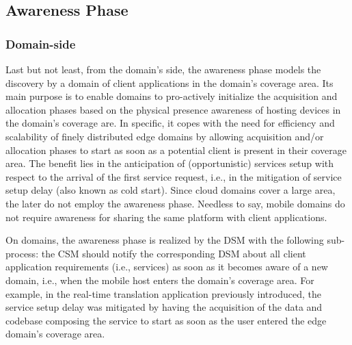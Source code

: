 \subsection{Awareness Phase}\label{sec:A3-E-awareness}




\subsubsection*{Domain-side} Last but not least, from the domain's side, the awareness phase models the discovery by a domain of client applications in the domain's coverage area. Its main purpose is to enable domains to pro-actively initialize the acquisition and allocation phases based on the physical presence awareness of hosting devices in the domain's coverage are. In specific, it copes with the need for efficiency and scalability of finely distributed edge domains by allowing acquisition and/or allocation phases to start as soon as a potential client is present in their coverage area. The benefit lies in the anticipation of (opportunistic) services setup with respect to the arrival of the first service request, i.e., in the mitigation of service setup delay (also known as cold start). Since cloud domains cover a large area, the later do not employ the awareness phase. Needless to say, mobile domains do not require awareness for sharing the same platform with client applications.

On domains, the awareness phase is realized by the DSM with the following sub-process: the CSM should notify the corresponding DSM about all client application requirements (i.e., services) as soon as it becomes aware of a new domain, i.e., when the mobile host enters the domain's coverage area. For example, in the real-time translation application previously introduced, the service setup delay was mitigated by having the acquisition of the data and codebase composing the service to start as soon as the user entered the edge domain's coverage area.

